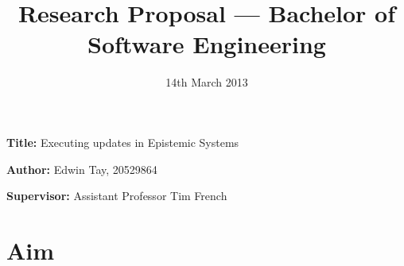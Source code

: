 \documentclass[12pt, a4paper]{article}
\title{Research Proposal --- Bachelor of Software Engineering}
\date{14th March 2013}
\newcommand{\namelistlabel}[1]{\mbox{#1}\hfil}
\newenvironment{namelist}[1]{%
\begin{list}{}
    {
        \let\makelabel\namelistlabel
        \settowidth{\labelwidth}{#1}
        \setlength{\leftmargin}{1.1\labelwidth}
    }
  }{%
\end{list}}
\begin{document}
\maketitle

\begin{namelist}{}
\item[{\bf Title:}]
  Executing updates in Epistemic Systems
  \item[{\bf Author:}]
	Edwin Tay, 20529864
\item[{\bf Supervisor:}]
	Assistant Professor Tim French
\end{namelist}

\section*{Aim}
\end{document}
